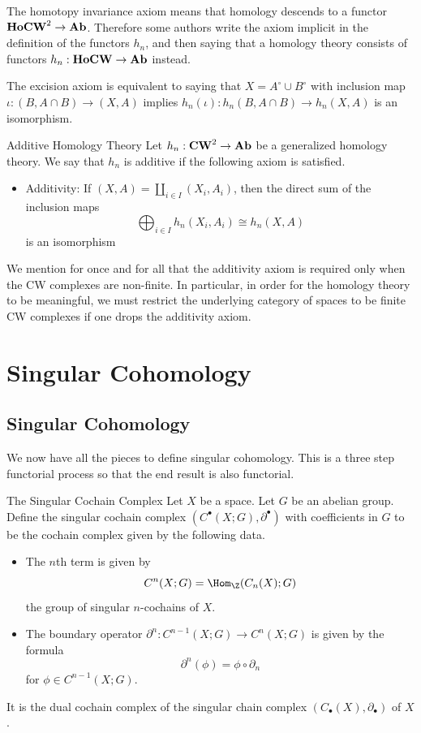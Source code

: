 \documentclass[a4paper]{article}
\begin{document}
The homotopy invariance axiom means that homology descends to a functor $\bold{HoCW}^2\to\bold{Ab}$. Therefore some authors write the axiom implicit in the definition of the functors $h_n$, and then saying that a homology theory consists of functors $h_n:\bold{HoCW}\to\bold{Ab}$ instead. 

\begin{lmm}{}{} The excision axiom is equivalent to saying that $X=A^\circ\cup B^\circ$ with inclusion map $\iota:(B,A\cap B)\to (X,A)$ implies $h_n(\iota):h_n(B,A\cap B)\to h_n(X,A)$ is an isomorphism. 
\end{lmm}

\begin{defn}{Additive Homology Theory}{} Let $h_n:\bold{CW}^2\to\bold{Ab}$ be a generalized homology theory. We say that $h_n$ is additive if the following axiom is satisfied. 
\begin{itemize}
\item Additivity: If $(X,A)=\coprod_{i\in I}(X_i,A_i)$, then the direct sum of the inclusion maps $$\bigoplus_{i\in I}h_n(X_i,A_i)\cong h_n(X,A)$$ is an isomorphism
\end{itemize}
\end{defn}

We mention for once and for all that the additivity axiom is required only when the CW complexes are non-finite. In particular, in order for the homology theory to be meaningful, we must restrict the underlying category of spaces to be finite CW complexes if one drops the additivity axiom. \\

\pagebreak
\section{Singular Cohomology}
\subsection{Singular Cohomology}
We now have all the pieces to define singular cohomology. This is a three step functorial process so that the end result is also functorial. 

\begin{defn}{The Singular Cochain Complex}{} Let $X$ be a space. Let $G$ be an abelian group. Define the singular cochain complex $(C^\bullet(X;G),\partial^\bullet)$ with coefficients in $G$ to be the cochain complex given by the following data. 
\begin{itemize}
\item The $n$th term is given by $$C^n(X;G)=\Hom_\Z(C_n(X);G)$$ the group of singular $n$-cochains of $X$. 
\item The boundary operator $\partial^n:C^{n-1}(X;G)\to C^n(X;G)$ is given by the formula $$\partial^n(\phi)=\phi\circ\partial_n$$ for $\phi\in C^{n-1}(X;G)$. 
\end{itemize}
It is the dual cochain complex of the singular chain complex $(C_\bullet(X),\partial_\bullet)$ of $X$. 
\end{defn}
\end{document}
